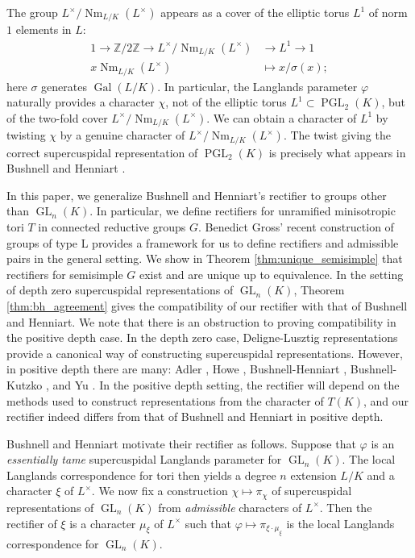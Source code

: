 \documentclass[11pt]{amsart}
\theoremstyle{plain}
\theoremstyle{definition}
\DeclareMathOperator{\Gal}{Gal}
\DeclareMathOperator{\Nm}{Nm}
\DeclareMathOperator{\GL}{GL}
\DeclareMathOperator{\PGL}{PGL}
\newcommand{\Lx}{L^\times}
\begin{document}
The group $\Lx / \Nm_{L/K}(\Lx)$ appears as a cover of the elliptic torus $L^1$ of norm $1$ elements in $L$:
\begin{align*}
1 \rightarrow \mathbb{Z} / 2 \mathbb{Z} \rightarrow \Lx / \Nm_{L/K}(\Lx) &\rightarrow L^1 \rightarrow 1 \\
x \Nm_{L/K}(L^{\times}) &\mapsto x / \sigma(x);
\end{align*}
here $\sigma$ generates $\Gal(L/K)$.  In particular, the Langlands parameter
$\varphi$ naturally provides a character $\chi$, not of the elliptic torus
$L^1 \subset \PGL_2(K)$,
but of the two-fold cover $\Lx / \Nm_{L/K}(\Lx)$.  We can obtain a character of $L^1$
by twisting $\chi$ by a genuine character of
$\Lx / \Nm_{L/K}(\Lx)$.  The twist giving the correct supercuspidal representation of $\PGL_2(K)$
is precisely what appears in Bushnell and Henniart \cite{bushnell-henniart:06a,bushnell-henniart:10a}.

In this paper, we generalize Bushnell and Henniart's
rectifier to groups other than $\GL_n(K)$.  In particular, we define rectifiers for
unramified minisotropic tori $T$ in connected reductive groups $G$.
Benedict Gross' recent construction of groups of type L provides a framework for
us to define rectifiers and admissible pairs in the general setting.
We show in Theorem \ref{thm:unique_semisimple} that rectifiers for semisimple $G$ exist
and are unique up to equivalence. In the setting of depth zero
supercuspidal representations of $\GL_{n}(K)$, Theorem \ref{thm:bh_agreement}
gives the compatibility of our rectifier with that of Bushnell and Henniart.
We note that there is an obstruction to proving compatibility in the positive depth case.
In the depth zero case, Deligne-Lusztig representations provide a canonical way of
constructing supercuspidal representations. However, in positive depth there are many:
Adler \cite{adler:98a}, Howe \cite{howe:77a}, Bushnell-Henniart \cite{bushnell-henniart:10a},
Bushnell-Kutzko \cite{bushnell-kutzko:AdmissibleDual}, and Yu \cite{yu:03a}.
In the positive depth setting, the rectifier will depend on the methods
used to construct representations from the character of $T(K)$, and
our rectifier indeed differs from that of Bushnell and Henniart in positive depth.

Bushnell and Henniart motivate their rectifier as follows.
Suppose that $\varphi$ is an \emph{essentially tame} supercuspidal Langlands parameter for
$\GL_n(K)$.  The local Langlands correspondence for tori then yields a degree $n$ extension
$L/K$ and a character $\xi$ of $L^{\times}$.  We now fix a construction $\chi \mapsto \pi_{\chi}$
of supercuspidal representations of $\GL_n(K)$ from \emph{admissible} characters of $L^{\times}$.
Then the rectifier of $\xi$ is a character $\mu_{\xi}$ of $L^{\times}$ such that
$\varphi \mapsto \pi_{\xi \cdot \mu_{\xi}}$ is the local Langlands correspondence for $\GL_n(K)$.
\end{document}
